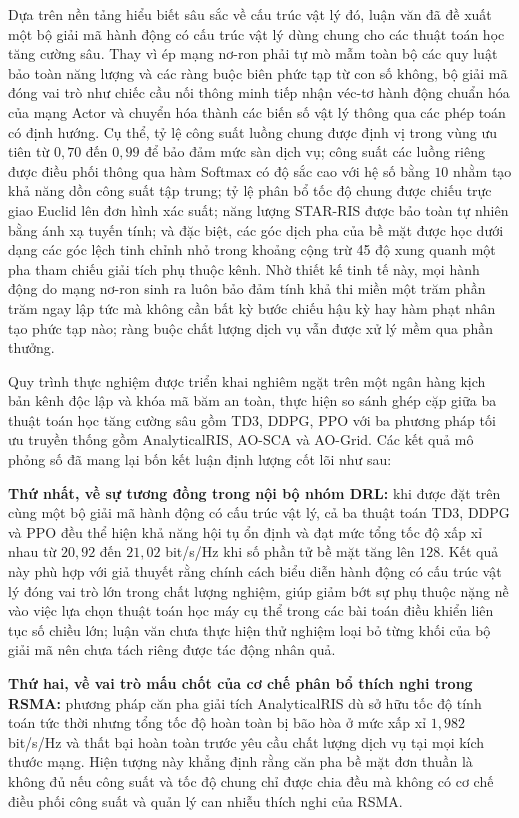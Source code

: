 Dựa trên nền tảng hiểu biết sâu sắc về cấu trúc vật lý đó, luận văn đã đề xuất một bộ giải mã hành động có cấu trúc
vật lý dùng chung cho các thuật toán học tăng cường sâu. Thay vì ép mạng nơ-ron phải tự mò mẫm toàn bộ các quy luật
bảo toàn năng lượng và các ràng buộc biên phức tạp từ con số không, bộ giải mã đóng vai trò như chiếc cầu nối thông
minh tiếp nhận véc-tơ hành động chuẩn hóa của mạng Actor và chuyển hóa thành các biến số vật lý thông qua các phép
toán có định hướng. Cụ thể, tỷ lệ công suất luồng chung được định vị trong vùng ưu tiên từ $0,70$ đến $0,99$ để bảo
đảm mức sàn dịch vụ; công suất các luồng riêng được điều phối thông qua hàm Softmax có độ sắc cao với hệ số bằng
$10$ nhằm tạo khả năng dồn công suất tập trung; tỷ lệ phân bổ tốc độ chung được chiếu trực giao Euclid lên đơn hình
xác suất; năng lượng STAR-RIS được bảo toàn tự nhiên bằng ánh xạ tuyến tính; và đặc biệt, các góc dịch pha của bề
mặt được học dưới dạng các góc lệch tinh chỉnh nhỏ trong khoảng cộng trừ 45 độ xung quanh một pha tham chiếu giải
tích phụ thuộc kênh. Nhờ thiết kế tinh tế này, mọi hành động do mạng nơ-ron sinh ra luôn bảo đảm tính khả thi miền
một trăm phần trăm ngay lập tức mà không cần bất kỳ bước chiếu hậu kỳ hay hàm phạt nhân tạo phức tạp nào; ràng buộc
chất lượng dịch vụ vẫn được xử lý mềm qua phần thưởng.

Quy trình thực nghiệm được triển khai nghiêm ngặt trên một ngân hàng kịch bản kênh độc lập và khóa mã băm an toàn,
thực hiện so sánh ghép cặp giữa ba thuật toán học tăng cường sâu gồm TD3, DDPG, PPO với ba phương pháp tối ưu truyền
thống gồm AnalyticalRIS, AO-SCA và AO-Grid. Các kết quả mô phỏng số đã mang lại bốn kết luận định lượng cốt lõi như
sau:

\textbf{Thứ nhất, về sự tương đồng trong nội bộ nhóm DRL:} khi được đặt trên cùng một bộ giải mã hành động có cấu
trúc vật lý, cả ba thuật toán TD3, DDPG và PPO đều thể hiện khả năng hội tụ ổn định và đạt mức tổng tốc độ xấp xỉ
nhau từ $20,92$ đến $21,02$ bit/s/Hz khi số phần tử bề mặt tăng lên $128$. Kết quả này phù hợp với giả thuyết rằng
chính cách biểu diễn hành động có cấu trúc vật lý đóng vai trò lớn trong chất lượng nghiệm, giúp giảm bớt sự phụ thuộc
nặng nề vào việc lựa chọn thuật toán học máy cụ thể trong các bài toán điều khiển liên tục số chiều lớn; luận văn chưa
thực hiện thử nghiệm loại bỏ từng khối của bộ giải mã nên chưa tách riêng được tác động nhân quả.

\textbf{Thứ hai, về vai trò mấu chốt của cơ chế phân bổ thích nghi trong RSMA:} phương pháp căn pha giải tích
AnalyticalRIS dù sở hữu tốc độ tính toán tức thời nhưng tổng tốc độ hoàn toàn bị bão hòa ở mức xấp xỉ $1,982$
bit/s/Hz và thất bại hoàn toàn trước yêu cầu chất lượng dịch vụ tại mọi kích thước mạng. Hiện tượng này khẳng định
rằng căn pha bề mặt đơn thuần là không đủ nếu công suất và tốc độ chung chỉ được chia đều mà không có cơ chế điều
phối công suất và quản lý can nhiễu thích nghi của RSMA.

